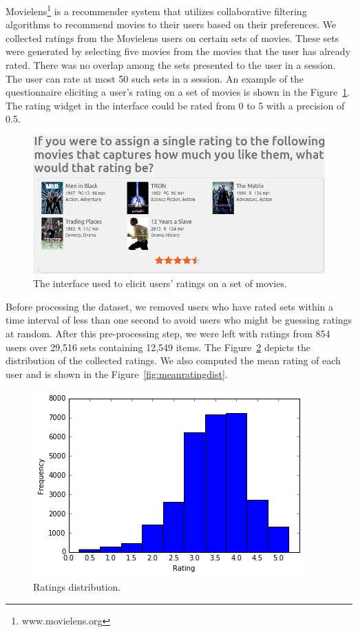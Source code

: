 
Movielens\footnote{www.movielens.org} is a recommender system that utilizes collaborative filtering
algorithms to recommend movies to their users based
on their preferences.
We collected ratings from the Movielens users on certain sets of movies. These
sets were generated by selecting five movies from the movies that the user has
already rated. There was no overlap among the sets presented to the user in a
session. The user can rate at most 50 such sets in a session. An example of
the questionnaire eliciting a user's rating on a set of movies is shown in the
Figure~\ref{fig:mlset}. The rating widget in the interface could be rated from 0 to 5 with a
precision of 0.5.

\begin{figure}[ht]
  \includegraphics[scale=0.30]{figures/mlset.png}
  \caption{The interface used to elicit users' ratings on a set of movies.}
  \label{fig:mlset}
\end{figure}


Before processing the dataset, we removed users who have rated sets within a
time interval of less than one second to avoid users who might be guessing
ratings at random. After this pre-processing step, we were left with ratings
from 854 users over 29,516  sets containing 12,549 items. The
Figure~\ref{fig:setratingdist} depicts
the distribution of the collected ratings. We also computed the mean rating of
each user and is shown in the Figure~\ref{fig:meanratingdist}.  

\begin{figure}[ht]
  \includegraphics[scale=0.65]{figures/setratingdist.png}
  \caption{Ratings distribution.}
  \label{fig:setratingdist}
\end{figure}

